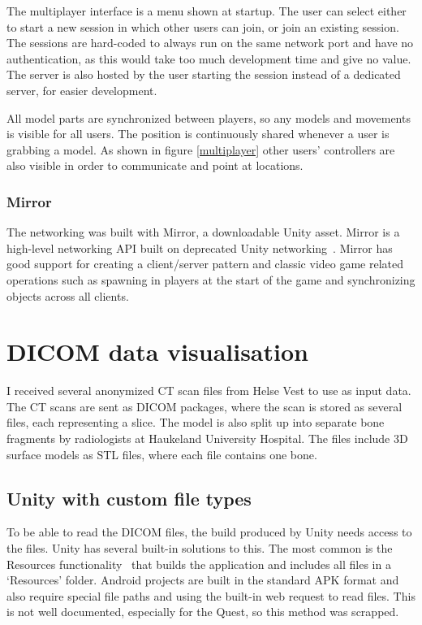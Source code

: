 \documentclass[a4paper]{report}
\begin{document}
The multiplayer interface is a menu shown at startup. The user can select either to start a new session in which other users can join, or join an existing session. The sessions are hard-coded to always run on the same network port and have no authentication, as this would take too much development time and give no value. The server is also hosted by the user starting the session instead of a dedicated server, for easier development.

All model parts are synchronized between players, so any models and movements is visible for all users. The position is continuously shared whenever a user is grabbing a model. As shown in figure \ref{multiplayer} other users' controllers are also visible in order to communicate and point at locations.


\subsubsection{Mirror}
The networking was built with Mirror, a downloadable Unity asset. Mirror is a high-level networking API built on deprecated Unity networking~\cite{noauthor_mirror_nodate}. Mirror has good support for creating a client/server pattern and classic video game related operations such as spawning in players at the start of the game and synchronizing objects across all clients.

\section{DICOM data visualisation}
I received several anonymized CT scan files from Helse Vest to use as input data. The CT scans are sent as DICOM packages, where the scan is stored as several files, each representing a slice.
The model is also split up into separate bone fragments by radiologists at Haukeland University Hospital. The files include 3D surface models as STL files, where each file contains one bone.


\subsection{Unity with custom file types}

To be able to read the DICOM files, the build produced by Unity needs access to the files. Unity has several built-in solutions to this.
The most common is the Resources functionality~\cite{resourcesload_unity_nodate} that builds the application and includes all files in a `Resources' folder. Android projects are built in the standard APK format and also require special file paths and using the built-in web request to read files. This is not well documented, especially for the Quest, so this method was scrapped.
\end{document}
